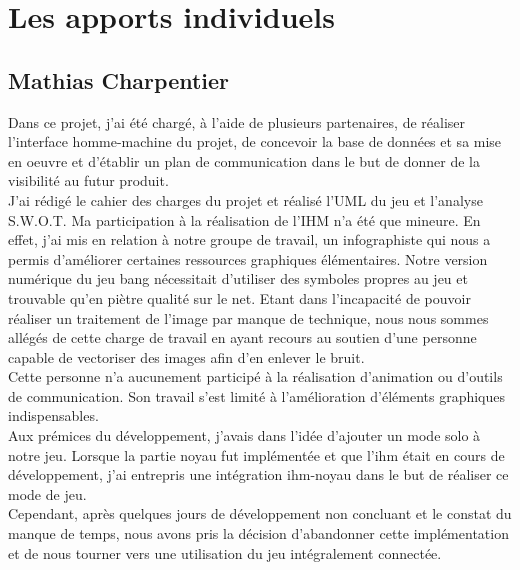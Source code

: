 \documentclass[a4paper,11pt]{article}
\begin{document}
\newpage

\section{Les apports individuels}



\subsection{Mathias Charpentier}


	Dans ce projet, j’ai été chargé, à l’aide de plusieurs partenaires, de réaliser l’interface homme-machine du projet, de concevoir la base de données et sa mise en oeuvre et d’établir un plan de communication dans le but de donner de la visibilité au futur produit. \\

    J’ai rédigé le cahier des charges du projet et réalisé l’UML du jeu et l’analyse S.W.O.T.
    Ma participation à la réalisation de l’IHM n’a été que mineure. En effet, j’ai mis en relation à notre groupe de travail, un infographiste qui nous a permis d’améliorer certaines ressources graphiques élémentaires.
    Notre version numérique du jeu bang nécessitait d’utiliser des symboles propres au jeu et trouvable qu’en piètre qualité sur le net. Etant dans l’incapacité de pouvoir réaliser un traitement de l’image par manque de technique, nous nous sommes allégés de cette charge de travail en ayant recours au soutien d’une personne capable de vectoriser des images afin d’en enlever le bruit. \\
 
    Cette personne n’a aucunement participé à la réalisation d’animation ou d’outils de communication. Son travail s’est limité à l’amélioration d’éléments graphiques indispensables. \\

    Aux prémices du développement, j’avais dans l’idée d’ajouter un mode solo à notre jeu. Lorsque la partie noyau fut implémentée et que l’ihm était en cours de développement, j’ai entrepris une intégration ihm-noyau dans le but de réaliser ce mode de jeu. \\

    Cependant, après quelques jours de développement non concluant et le constat du manque de temps, nous avons pris la décision d’abandonner cette implémentation et de nous tourner vers une utilisation du jeu intégralement connectée. \\ 
\end{document}
